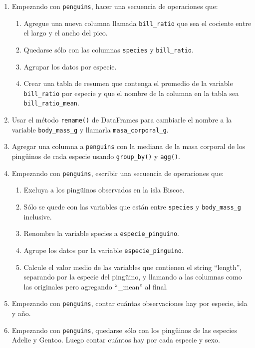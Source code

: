 \documentclass[a4paper,11pt]{article}
\theoremstyle{definition}
\begin{document}
\begin{enumerate}
\item Empezando con \lstinline{penguins}, hacer una secuencia de operaciones que:
\begin{enumerate}
\item Agregue una nueva columna llamada \lstinline{bill_ratio} que sea el cociente entre el largo y el ancho del pico.
\item Quedarse sólo con las columnas \lstinline{species} y \lstinline{bill_ratio}.
\item Agrupar los datos por especie.
\item Crear una tabla de resumen que contenga el promedio de la variable \lstinline{bill_ratio} por especie y que el nombre de la columna en la tabla sea \lstinline{bill_ratio_mean}.
\end{enumerate}

\item Usar el método \lstinline{rename()} de DataFrames para cambiarle el nombre a la variable \lstinline{body_mass_g} y llamarla \lstinline{masa_corporal_g}.

\item Agregar una columna a \lstinline{penguins} con la mediana de la masa corporal de los ping\"uinos de cada especie usando \lstinline{group_by()} y \lstinline{agg()}.

\item Empezando con \lstinline{penguins}, escribir una secuencia de operaciones que:
\begin{enumerate}
\item Excluya a los ping\"uinos observados en la isla Biscoe.
\item Sólo se quede con las variables que están entre \lstinline{species} y \lstinline{body_mass_g} inclusive.
\item Renombre la variable species a \lstinline{especie_pinguino}.
\item Agrupe los datos por la variable \lstinline{especie_pinguino}.
\item Calcule el valor medio de las variables que contienen el string ``length'', separando por la especie del ping\"uino, y llamando a las columnas como las originales pero agregando ``\_mean'' al final.
\end{enumerate}

\item Empezando con \lstinline{penguins}, contar cuántas observaciones hay por especie, isla y año.

\item Empezando con \lstinline{penguins}, quedarse sólo con los ping\"uinos de las especies Adelie y Gentoo. Luego contar cuántos hay por cada especie y sexo.


\end{enumerate}
\end{document}
